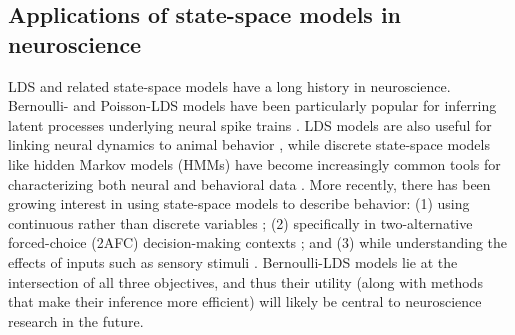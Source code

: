 \subsection{Applications of state-space models in neuroscience}
\label{sec:bestlds:background:applications}

LDS and related state-space models have a long history in neuroscience. Bernoulli- and Poisson-LDS models have been particularly popular for inferring latent processes underlying neural spike trains \cite{gao_high-dimensional_2015, nonnenmacher_extracting_2017, zoltowski_general_2020, valente_probing_2022}. LDS models are also useful for linking neural dynamics to animal behavior \cite{linderman_hierarchical_2019}, while discrete state-space models like hidden Markov models (HMMs) have become increasingly common tools for characterizing both neural \cite{escola_hidden_2011} and behavioral data \cite{wiltschko_mapping_2015, calhoun_unsupervised_2019, wiltschko_revealing_2020}. More recently, there has been growing interest in using state-space models to describe behavior: (1) using  continuous rather than discrete variables \cite{johnson_composing_2016, costacurta_distinguishing_2022}; (2) specifically in two-alternative forced-choice (2AFC) decision-making contexts \cite{roy_extracting_2021};  and (3) while understanding the effects of inputs such as sensory stimuli \cite{calhoun_unsupervised_2019, bolkan_opponent_2022, ashwood_mice_2022}. Bernoulli-LDS models lie at the intersection of all three objectives, and thus their utility (along with methods that make their inference more efficient) will likely be central to neuroscience research in the future.